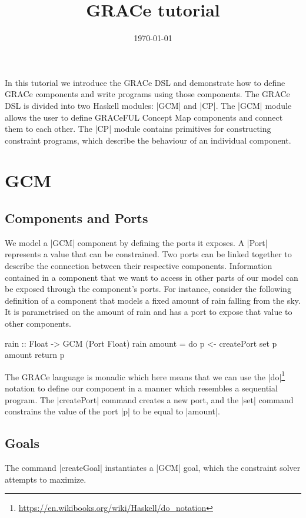 \documentclass[a4paper]{article}
\title{GRACe tutorial}
\author{}
\date{\today}
\begin{document}
\maketitle


\noindent
In this tutorial we introduce the GRACe DSL and demonstrate how to define GRACe
components and write programs using those components. The GRACe DSL is divided
into two Haskell modules: |GCM| and |CP|. The |GCM| module allows the user to
define GRACeFUL Concept Map components and connect them to each other. The |CP|
module contains primitives for constructing constraint programs, which describe
the behaviour of an individual component.


\section{GCM}
\subsection{Components and Ports}

We model a |GCM| component by defining the ports it exposes. A |Port| represents
a value that can be constrained. Two ports can be linked together to describe
the connection between their respective components. Information contained in a
component that we want to access in other parts of our model can be exposed
through the component's ports. For instance, consider the following definition
of a component that models a fixed amount of rain falling from the sky.  It is
parametrised on the amount of rain and has a port to expose that value to other
components.
\begin{haskellcode}
rain :: Float -> GCM (Port Float)
rain amount = do
  p <- createPort
  set p amount
  return p
\end{haskellcode}
The GRACe language is monadic which here means that we can use the
|do|\footnote{\url{https://en.wikibooks.org/wiki/Haskell/do_notation}}
notation to define our component in a manner which resembles a
sequential program. The |createPort| command creates a new port, and
the |set| command constrains the value of the port |p| to be equal to
|amount|.

\subsection{Goals}\label{goals}
The command |createGoal| instantiates a |GCM| goal, which the constraint
solver attempts to maximize.
\end{document}
